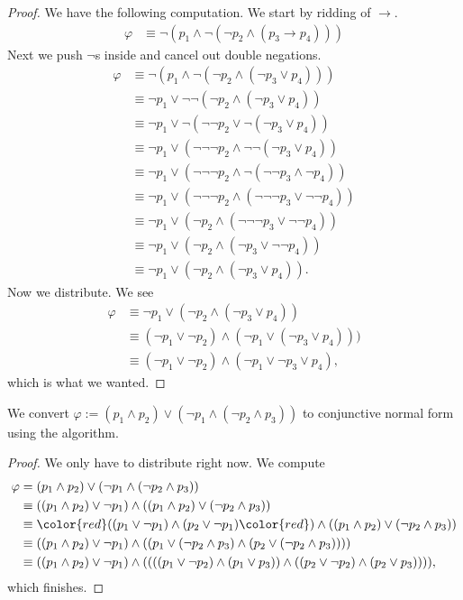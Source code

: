 \begin{proof}
	We have the following computation. We start by ridding of $\to$.
	\begin{align*}
		\varphi &\equiv\lnot(p_1\land\lnot(\lnot p_2\land(p_3\to p_4)))
	\end{align*}
	Next we push $\lnot$s inside and cancel out double negations.
	\begin{align*}
		\varphi &\equiv\lnot(p_1\land\lnot(\lnot p_2\land(\lnot p_3\lor p_4))) \\
		&\equiv\lnot p_1\lor\lnot\lnot(\lnot p_2\land(\lnot p_3\lor p_4)) \\
		&\equiv\lnot p_1\lor\lnot(\lnot\lnot p_2\lor\lnot(\lnot p_3\lor p_4)) \\
		&\equiv\lnot p_1\lor(\lnot\lnot\lnot p_2\land\lnot\lnot(\lnot p_3\lor p_4)) \\
		&\equiv\lnot p_1\lor(\lnot\lnot\lnot p_2\land\lnot(\lnot\lnot p_3\land \lnot p_4)) \\
		&\equiv\lnot p_1\lor(\lnot\lnot\lnot p_2\land(\lnot\lnot\lnot p_3\lor \lnot\lnot p_4)) \\
		&\equiv\lnot p_1\lor(\lnot p_2\land(\lnot\lnot\lnot p_3\lor \lnot\lnot p_4)) \\
		&\equiv\lnot p_1\lor(\lnot p_2\land(\lnot p_3\lor \lnot\lnot p_4)) \\
		&\equiv\lnot p_1\lor(\lnot p_2\land(\lnot p_3\lor p_4)).
	\end{align*}
	Now we distribute. We see
	\begin{align*}
		\varphi & \equiv\lnot p_1\lor(\lnot p_2\land(\lnot p_3\lor p_4)) \\
		& \equiv(\lnot p_1\lor\lnot p_2)\land(\lnot p_1\lor(\lnot p_3\lor p_4))) \\
		& \equiv\boxed{(\lnot p_1\lor\lnot p_2)\land(\lnot p_1\lor\lnot p_3\lor p_4)},
	\end{align*}
	which is what we wanted.
\end{proof}
\begin{exe}
	We convert $\varphi:=(p_1\land p_2)\lor(\lnot p_1\land(\lnot p_2\land p_3))$ to conjunctive normal form using the algorithm.
\end{exe}
\begin{proof}
	We only have to distribute right now. We compute
	\begin{align*}
		\varphi &= (p_1\land p_2)\lor(\lnot p_1\land(\lnot p_2\land p_3)) \\
		&\equiv ((p_1\land p_2)\lor\lnot p_1)\land((p_1\land p_2)\lor(\lnot p_2\land p_3)) \\
		&\equiv {\color{red}(}(p_1\lor\lnot p_1)\land(p_2\lor\lnot p_1){\color{red})}\land((p_1\land p_2)\lor(\lnot p_2\land p_3)) \\
		&\equiv ((p_1\land p_2)\lor\lnot p_1)\land((p_1\lor(\lnot p_2\land p_3)\land( p_2\lor(\lnot p_2\land p_3)))) \\
		&\equiv ((p_1\land p_2)\lor\lnot p_1)\land((((p_1\lor\lnot p_2)\land (p_1\lor p_3))\land( (p_2\lor\lnot p_2)\land(p_2\lor p_3)))),
	\end{align*}
	which finishes.
\end{proof}